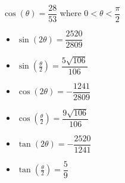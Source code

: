 {$\cos(\theta) = \dfrac{28}{53}$ where $0 < \theta < \dfrac{\pi}{2}$}
{\begin{itemize}
\item $\sin(2\theta) = \dfrac{2520}{2809}$
\item $\sin\left(\frac{\theta}{2}\right) = \dfrac{5\sqrt{106}}{106}$
\item $\cos(2\theta) = -\dfrac{1241}{2809}$
\item $\cos\left(\frac{\theta}{2}\right) = \dfrac{9\sqrt{106}}{106}$
\item $\tan(2\theta) = -\dfrac{2520}{1241}$
\item $\tan\left(\frac{\theta}{2}\right) = \dfrac{5}{9}$
\end{itemize}}